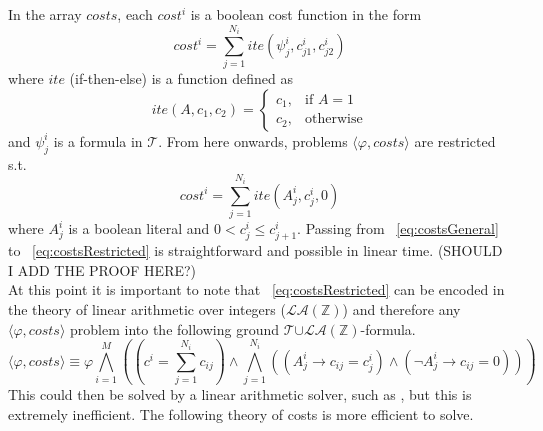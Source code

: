 \documentclass{amsart}
\theoremstyle{definition}
\theoremstyle{remark}
\numberwithin{equation}{section}
\def\T{$\mathcal{T}$}
\begin{document}
    In the array $costs$, each $cost^{i}$ is a boolean cost function in the form
    \begin{equation}
      \label{eq:costsGeneral}
    	cost^{i} = \sum\limits_{j=1}^{N_{i}} ite(\psi^{i}_{j},c^{i}_{j1},c^{i}_{j2})
    \end{equation}
    where $ite$ (if-then-else) is a function defined as
    \[
      ite(A,c_{1},c_{2}) = 
    	\begin{cases}
        c_{1},& \text{if } A = 1 \\
        c_{2},& \text{otherwise}
    	\end{cases}
    \]
    and $\psi_{j}^{i}$ is a formula in \T{}. From here onwards, problems $\langle \varphi, costs \rangle$ are restricted s.t.
    \begin{equation}
    \label{eq:costsRestricted}
    	cost^{i} = \sum\limits_{j=1}^{N_{i}} ite(A^{i}_{j},c^{i}_{j},0)
    \end{equation}
    where $A_{j}^{i}$ is a boolean literal and $0 < c^{i}_{j} \leq c^{i}_{j+1}$.
    Passing from ~\eqref{eq:costsGeneral} to ~\eqref{eq:costsRestricted} is straightforward and possible in linear time. (SHOULD I ADD THE PROOF HERE?) \\
    
    At this point it is important to note that ~\eqref{eq:costsRestricted} can be encoded in the theory of linear arithmetic over integers ($\mathcal{LA}(\mathbb{Z})$) and therefore any $\langle \varphi, costs \rangle$ problem into the following ground \T{}$\cup \mathcal{LA}(\mathbb{Z})$-formula.
    \begin{equation}
    	\label{eq:encodingSMTIntoLA}
    	\langle \varphi, costs \rangle \equiv \varphi \bigwedge\limits_{i=1}^{M}\left(\left(c^{i} = \sum\limits_{j=1}^{N_{i}}c_{ij}\right) \land \bigwedge\limits_{j=1}^{N_{i}}\left(\left(A^{i}_{j} \to c_{ij} = c^{i}_{j}\right) \land \left(\neg A^{i}_{j} \to c_{ij} = 0\right)\right)\right)
    \end{equation}
    This could then be solved by a linear arithmetic solver, such as \cite{dutertre06}, but this is extremely inefficient. The following theory of costs is more efficient to solve.
\end{document}
